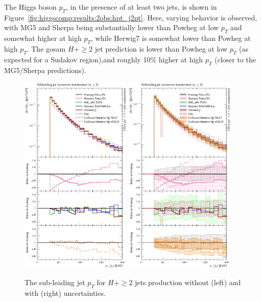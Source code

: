 The Higgs boson $p_T$, in the presence of at least two jets, is shown
in Figure~\ref{fig:higgscomp:results:2obs:hpt_j2pt}. Here, varying
behavior is observed, with MG5 and Sherpa being substantially lower
than Powheg at low $p_T$ and somewhat higher at high $p_T$, while
Herwig7 is somewhat lower than Powheg at high $p_T$. The gosam
$H+\ge2$ jet prediction is lower than Powheg at low $p_T$ (as expected
for a Sudakov region),and roughly 10\% higher at high $p_T$ (closer to
the MG5/Sherpa predictions).

\begin{figure}[t!]
  \centering
  \includegraphics[width=0.47\textwidth]{figures/hjetscomp_u_jet2_pT_incl.pdf}
  \hfill
  \includegraphics[width=0.47\textwidth]{figures/hjetscomp_jet2_pT_incl.pdf}
  \caption{
    The sub-leading jet $p_T$ for $H+\ge2$ jets production without
    (left) and with (right) uncertainties.
    \label{fig:higgscomp:results:2obs:jet2_pt}
  }
\end{figure}

